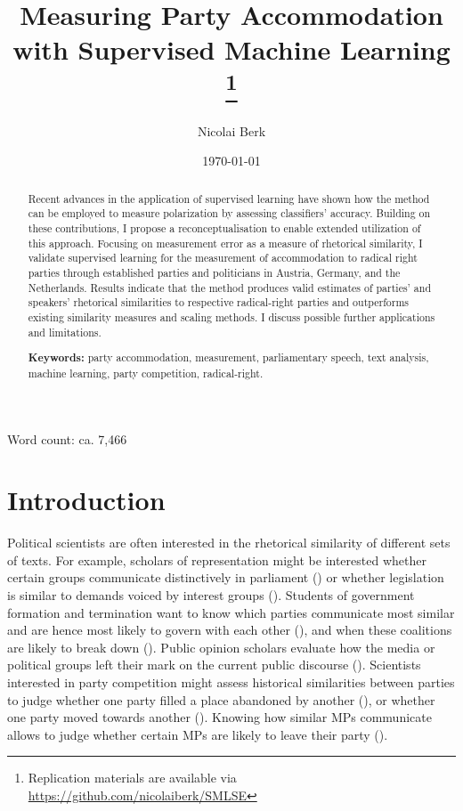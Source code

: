 \documentclass{article}
\title{Measuring Party Accommodation with Supervised Machine Learning
\footnote{Replication materials are available via \href{https://github.com/nicolaiberk/SMLSE}{https://github.com/nicolaiberk/SMLSE}}
}
\author{Nicolai Berk}
\date{\today}
\begin{document}
\maketitle


\begin{abstract}
Recent advances in the application of supervised learning have shown how the method can be employed to measure polarization by assessing classifiers' accuracy. Building on these contributions, I propose a reconceptualisation to enable extended utilization of this approach. Focusing on measurement error as a measure of rhetorical similarity, I validate supervised learning for the measurement of accommodation to radical right parties through established parties and politicians in Austria, Germany, and the Netherlands. Results indicate that the method produces valid estimates of parties' and speakers' rhetorical similarities to respective radical-right parties and outperforms existing similarity measures and scaling methods. I discuss possible further applications and limitations.\par \medskip


\textbf{Keywords:} party accommodation, measurement, parliamentary speech, text analysis, machine learning, party competition, radical-right.
\end{abstract}

\begin{center}
Word count: ca. 7,466
\end{center}

\section{Introduction}
\label{sec:Intro}
Political scientists are often interested in the rhetorical similarity of different sets of texts. For example, scholars of representation might be interested whether certain groups communicate distinctively in parliament (\cite{Pitkin1967}) or whether legislation is similar to demands voiced by interest groups (\cite{Gilens2014a}). Students of government formation and termination want to know which parties communicate most similar and are hence most likely to govern with each other (\cite{Gamson1961}), and when these coalitions are likely to break down (\cite{Lupia1995CoalitionTermination}). Public opinion scholars evaluate how the media or political groups left their mark on the current public discourse (\cite{Zaller1992}). Scientists interested in party competition might assess historical similarities between parties to judge whether one party filled a place abandoned by another (\cite{Kitschelt1986}), or whether one party moved towards another (\cite{Downs1957}). Knowing how similar MPs communicate allows to judge whether certain MPs are likely to leave their party (\cite{Hirschman1970}).\par
\end{document}
